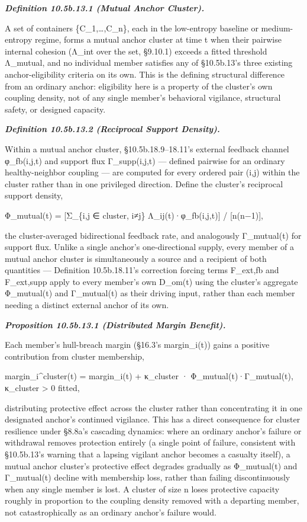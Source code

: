 \documentclass[
]{article}
\begin{document}
\emph{\textbf{Definition 10.5b.13.1 (Mutual Anchor Cluster).}}

A set of containers \{C\_1,\ldots,C\_n\}, each in the low-entropy
baseline or medium-entropy regime, forms a mutual anchor cluster at time
t when their pairwise internal cohesion (Λ\_int over the set, §9.10.1)
exceeds a fitted threshold Λ\_mutual, and no individual member satisfies
any of §10.5b.13's three existing anchor-eligibility criteria on its
own. This is the defining structural difference from an ordinary anchor:
eligibility here is a property of the cluster's own coupling density,
not of any single member's behavioral vigilance, structural safety, or
designed capacity.

\emph{\textbf{Definition 10.5b.13.2 (Reciprocal Support Density).}}

Within a mutual anchor cluster, §10.5b.18.9--18.11's external feedback
channel φ\_fb(i,j,t) and support flux Γ\_supp(i,j,t) --- defined
pairwise for an ordinary healthy-neighbor coupling --- are computed for
every ordered pair (i,j) within the cluster rather than in one
privileged direction. Define the cluster's reciprocal support density,

Φ\_mutual(t) = {[}Σ\_\{i,j ∈ cluster, i≠j\} Λ\_ij(t)·φ\_fb(i,j,t){]} /
{[}n(n−1){]},

the cluster-averaged bidirectional feedback rate, and analogously
Γ\_mutual(t) for support flux. Unlike a single anchor's one-directional
supply, every member of a mutual anchor cluster is simultaneously a
source and a recipient of both quantities --- Definition 10.5b.18.11's
correction forcing terms F\_ext,fb and F\_ext,supp apply to every
member's own D\_om(t) using the cluster's aggregate Φ\_mutual(t) and
Γ\_mutual(t) as their driving input, rather than each member needing a
distinct external anchor of its own.

\emph{\textbf{Proposition 10.5b.13.1 (Distributed Margin Benefit).}}

Each member's hull-breach margin (§16.3's margin\_i(t)) gains a positive
contribution from cluster membership,

margin\_i\^{}cluster(t) = margin\_i(t) + κ\_cluster ·
Φ\_mutual(t)·Γ\_mutual(t), κ\_cluster \textgreater{} 0 fitted,

distributing protective effect across the cluster rather than
concentrating it in one designated anchor's continued vigilance. This
has a direct consequence for cluster resilience under §8.8a's cascading
dynamics: where an ordinary anchor's failure or withdrawal removes
protection entirely (a single point of failure, consistent with
§10.5b.13's warning that a lapsing vigilant anchor becomes a casualty
itself), a mutual anchor cluster's protective effect degrades gradually
as Φ\_mutual(t) and Γ\_mutual(t) decline with membership loss, rather
than failing discontinuously when any single member is lost. A cluster
of size n loses protective capacity roughly in proportion to the
coupling density removed with a departing member, not catastrophically
as an ordinary anchor's failure would.
\end{document}

